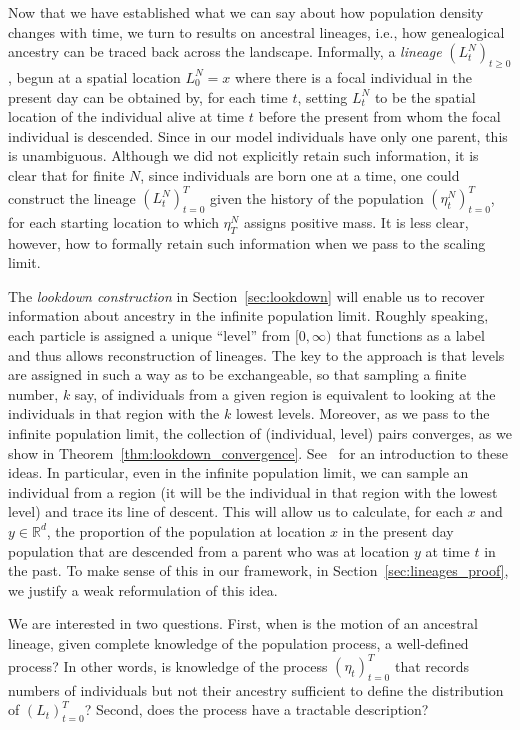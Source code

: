 \documentclass[EJP]{ejpecp} %
\newcommand{\IR}{\mathbb R}
\newcommand{\citet}[1]{\cite{#1}}
\begin{document}
Now that we have established what we can say about how 
population density changes with time,
we turn to results on ancestral lineages,
i.e., how genealogical ancestry can be traced back across the landscape.
Informally,
a \emph{lineage} $(L_t^N)_{t \ge 0}$,
begun at a spatial location $L_0^N = x$
where there is a focal individual in the present day
can be obtained by, for each time $t$,
setting $L_t^N$ to be the spatial location of the individual alive at time $t$
before the present from
whom the focal individual is descended.
Since in our model individuals have only one parent, this is unambiguous.
Although we did not explicitly retain such information,
it is clear that for finite $N$, since individuals are born one at a time, 
one could construct the lineage $(L_t^N)_{t=0}^T$
given the history of the population $(\eta^N_t)_{t = 0}^T$,
for each starting location to which $\eta^N_T$ assigns positive mass.
It is less clear, however, how to formally retain such information when we 
pass to the scaling limit.

The \emph{lookdown construction} in Section~\ref{sec:lookdown}
will enable us to recover information about ancestry in the infinite
population limit.
Roughly speaking,
each particle is assigned a unique ``level'' from $[0,\infty)$
that functions as a label and thus allows reconstruction of lineages.
The key to the approach is that levels are assigned in such a way as to be exchangeable, 
so that sampling a finite number, $k$ say, of
individuals from a given 
region is equivalent to looking at the individuals in that region with the $k$ lowest levels.
Moreover, as we pass to the infinite population limit,
the collection of (individual, level) pairs converges,
as we show in Theorem~\ref{thm:lookdown_convergence}.
See~\citet{etheridge/kurtz:2019} for an introduction to these ideas.
In particular, even in the infinite
population limit, we can sample an individual
from a region (it will be the individual in that region with the lowest level) 
and trace its line of descent. 
This will allow us to calculate, for each $x$ and $y\in\IR^d$, the proportion of
the population at location $x$ in the present day population that are descended from 
a parent who was at location $y$ at time $t$ in the past. To make
sense of this in our framework, in Section~\ref{sec:lineages_proof}, 
we justify a weak reformulation of this idea.

We are interested in two questions.
First, when is the motion of an ancestral 
lineage, given complete knowledge of the population process, a well-defined process?
In other words, is knowledge of the process $(\eta_t)_{t=0}^T$ that records 
numbers of individuals
but not their ancestry sufficient to define the distribution of $(L_t)_{t=0}^T$? 
Second, does the process have a tractable description?
\end{document}
